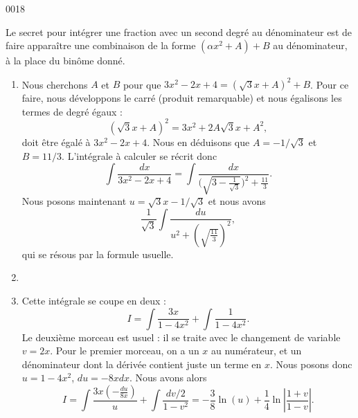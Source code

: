 \begin{corrige}{0018}

Le secret pour intégrer une fraction avec un second degré au dénominateur est de faire apparaître une combinaison de la forme $(\alpha x^2+A)+B$ au dénominateur, à la place du binôme donné.

\begin{enumerate}

\item
 Nous cherchons $A$ et $B$ pour que $3x^2-2x+4=(\sqrt{3}x+A)^2+B$. Pour ce faire, nous développons le carré (produit remarquable) et nous égalisons les termes de degré égaux :
\begin{equation}
	(\sqrt{3}x+A)^2=3x^2+2A\sqrt{3}x+A^2,
\end{equation}
doit être égalé à $3x^2-2x+4$. Nous en déduisons que $A=-1/\sqrt{3}$ et $B=11/3$. L'intégrale à calculer se récrit donc
\begin{equation}
	\int\frac{ dx }{ 3x^2-2x+4 }=\int\frac{ dx }{ \big( \sqrt{3-\frac{1}{ \sqrt{3} }} \big)^2+\frac{ 11 }{ 3 } }.
\end{equation}
Nous posons maintenant $u=\sqrt{3}x-1/\sqrt{3}$ et nous avons
\begin{equation}
	\frac{1}{ \sqrt{3} }\int\frac{ du }{ u^2+ \left( \sqrt{\frac{ 11 }{ 3 }} \right)^2  },
\end{equation}
qui se résous par la formule usuelle.

\item
\item
Cette intégrale se coupe en deux :
\begin{equation}
	I=\int\frac{ 3x }{ 1-4x^2 }+\int\frac{ 1 }{ 1-4x^2 }.
\end{equation}
Le deuxième morceau est usuel : il se traite avec le changement de variable $v=2x$. Pour le premier morceau, on a un $x$ au numérateur, et un dénominateur dont la dérivée contient juste un terme en $x$. Nous posons donc $u=1-4x^2$, $du=-8xdx$. Nous avons alors
\begin{equation}
	I=\int\frac{ 3x\left( -\frac{ du }{ 8x } \right) }{ u }+\int\frac{ dv/2 }{ 1-v^2 }=-\frac{ 3 }{ 8 }\ln(u)+\frac{1}{ 4 }\ln\left| \frac{ 1+v }{ 1-v } \right| .
\end{equation}


\end{enumerate}
\end{corrige}
